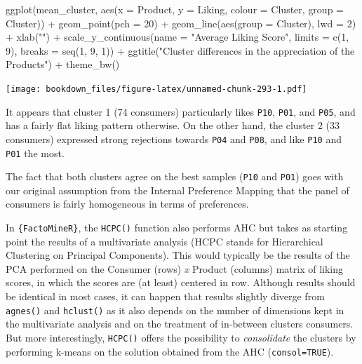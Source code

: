 \documentclass[
]{krantz}
\makeatletter
\newenvironment{Shaded}{\begin{snugshade}}{\end{snugshade}}
\newcommand{\AttributeTok}[1]{\textcolor[rgb]{0.61,0.61,0.61}{#1}}
\newcommand{\DecValTok}[1]{\textcolor[rgb]{0.06,0.06,0.06}{#1}}
\newcommand{\FunctionTok}[1]{\textcolor[rgb]{0,0,0}{#1}}
\newcommand{\NormalTok}[1]{#1}
\newcommand{\SpecialCharTok}[1]{\textcolor[rgb]{0,0,0}{#1}}
\newcommand{\StringTok}[1]{\textcolor[rgb]{0.5,0.5,0.5}{#1}}
\renewenvironment{quote}{\begin{VF}}{\end{VF}}
\newenvironment{kframe}{%
\medskip{}
\setlength{\fboxsep}{.8em}
 \def\at@end@of@kframe{}%
 \ifinner\ifhmode%
  \def\at@end@of@kframe{\end{minipage}}%
  \begin{minipage}{\columnwidth}%
 \fi\fi%
 \def\FrameCommand##1{\hskip\@totalleftmargin \hskip-\fboxsep
 \colorbox{shadecolor}{##1}\hskip-\fboxsep
     \hskip-\linewidth \hskip-\@totalleftmargin \hskip\columnwidth}%
 \MakeFramed {\advance\hsize-\width
   \@totalleftmargin\z@ \linewidth\hsize
   \@setminipage}}%
 {\par\unskip\endMakeFramed%
 \at@end@of@kframe}
\renewenvironment{Shaded}{\begin{kframe}}{\end{kframe}}
\makeatother
\begin{document}
\begin{Shaded}
\begin{Highlighting}[]
\FunctionTok{ggplot}\NormalTok{(mean\_cluster, }\FunctionTok{aes}\NormalTok{(}\AttributeTok{x =}\NormalTok{ Product, }\AttributeTok{y =}\NormalTok{ Liking, }
                         \AttributeTok{colour =}\NormalTok{ Cluster, }\AttributeTok{group =}\NormalTok{ Cluster)) }\SpecialCharTok{+}
  \FunctionTok{geom\_point}\NormalTok{(}\AttributeTok{pch =} \DecValTok{20}\NormalTok{) }\SpecialCharTok{+}
  \FunctionTok{geom\_line}\NormalTok{(}\FunctionTok{aes}\NormalTok{(}\AttributeTok{group =}\NormalTok{ Cluster), }\AttributeTok{lwd =} \DecValTok{2}\NormalTok{) }\SpecialCharTok{+}
  \FunctionTok{xlab}\NormalTok{(}\StringTok{""}\NormalTok{) }\SpecialCharTok{+}
  \FunctionTok{scale\_y\_continuous}\NormalTok{(}\AttributeTok{name =} \StringTok{"Average Liking Score"}\NormalTok{, }
                     \AttributeTok{limits =} \FunctionTok{c}\NormalTok{(}\DecValTok{1}\NormalTok{, }\DecValTok{9}\NormalTok{), }\AttributeTok{breaks =} \FunctionTok{seq}\NormalTok{(}\DecValTok{1}\NormalTok{, }\DecValTok{9}\NormalTok{, }\DecValTok{1}\NormalTok{)) }\SpecialCharTok{+}
  \FunctionTok{ggtitle}\NormalTok{(}\StringTok{"Cluster differences in the appreciation of the Products"}\NormalTok{) }\SpecialCharTok{+}
  \FunctionTok{theme\_bw}\NormalTok{()}
\end{Highlighting}
\end{Shaded}

\texttt{[image: bookdown\_files/figure-latex/unnamed-chunk-293-1.pdf]}

It appears that cluster 1 (74 consumers) particularly likes \texttt{P10}, \texttt{P01}, and \texttt{P05}, and has a fairly flat liking pattern otherwise. On the other hand, the cluster 2 (33 consumers) expressed strong rejections towards \texttt{P04} and \texttt{P08}, and like \texttt{P10} and \texttt{P01} the most.

The fact that both clusters agree on the best samples (\texttt{P10} and \texttt{P01}) goes with our original assumption from the Internal Preference Mapping that the panel of consumers is fairly homogeneous in terms of preferences.

\begin{quote}
In \texttt{\{FactoMineR\}}, the \texttt{HCPC()} function also performs AHC but takes as starting point the results of a multivariate analysis (HCPC stands for Hierarchical Clustering on Principal Components). This would typically be the results of the PCA performed on the Consumer (rows) \emph{x} Product (columns) matrix of liking scores, in which the scores are (at least) centered in row.
Although results should be identical in most cases, it can happen that results slightly diverge from \texttt{agnes()} and \texttt{hclust()} as it also depends on the number of dimensions kept in the multivariate analysis and on the treatment of in-between clusters consumers. But more interestingly, \texttt{HCPC()} offers the possibility to \emph{consolidate} the clusters by performing k-means on the solution obtained from the AHC (\texttt{consol=TRUE}).
\end{quote}
\end{document}
